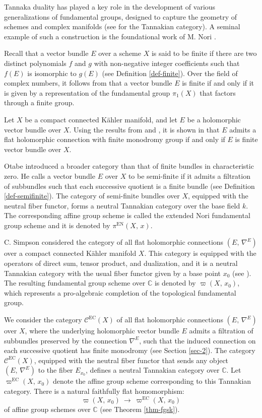 \documentclass[12pt]{amsart}
\theoremstyle{definition}
\numberwithin{equation}{section}
\newcommand{\C}{\mathbb{C}}
\newcommand{\EC}{\mathcal{C}^\mathrm{EC}}
\begin{document}
Tannaka duality has played a key role in the development of various generalizations 
of fundamental groups, designed to capture the geometry of schemes and complex 
manifolds (see \cite{DM} for the Tannakian category). A seminal example of such a 
construction is the foundational work of M. Nori \cite{No}.

Recall that a vector bundle $E$ over a scheme $X$ is said to be finite if there are 
two distinct polynomials $f$ and $g$ with non-negative integer coefficients such that 
$f(E)$ is isomorphic to $g(E)$ (see Definition \ref{def-finite}).
Over the field of complex numbers, it follows from \cite{No} that a vector bundle 
$E$ is finite if and only if it is given by a representation of the fundamental 
group $\pi_1(X)$ that factors through a finite group.

Let $X$ be a compact connected K\"ahler manifold, and let $E$ be a holomorphic vector 
bundle over $X$. Using the results from \cite{DPS} and \cite{Si}, it is shown in 
\cite{BHS} that $E$ admits a flat holomorphic connection with finite monodromy group
if and only if  $E$ is finite vector bundle over $X$.

Otabe \cite{Ot} introduced a broader category than that of finite bundles in 
characteristic zero. He calls a vector bundle $E$ over $X$ to be semi-finite 
if it admits a filtration of subbundles such that each successive quotient is a finite bundle 
(see Definition \ref{def-semifinite}). The category of semi-finite bundles over $X$, 
equipped with the neutral fiber functor, forms a neutral Tannakian category over the base field $k$. 
The corresponding affine group scheme is called the extended Nori fundamental group 
scheme and it is denoted by $\pi^{\mathrm{EN}}(X,\,x)$. 

C. Simpson \cite{Si} considered the category of all flat holomorphic connections 
$(E,\, \nabla^E)$ over a compact connected K\"ahler manifold $X$. 
This category is equipped with the operators of direct sum, tensor product, and 
dualization, and it is a neutral Tannakian category with the usual fiber functor given 
by a base point $x_0$ (see \cite[p. 70]{Si}). The resulting fundamental group scheme 
over $\C$ is denoted by $\varpi(X,\, x_0)$, which represents a pro-algebraic completion 
of the topological fundamental group. 

We consider the category $\EC(X)$ of all flat holomorphic connections $(E,\, \nabla^E)$ over 
$X$, where the underlying holomorphic vector bundle $E$ admits a filtration of subbundles 
preserved by the connection $\nabla^E$, such that the induced connection on each 
successive quotient has finite monodromy (see Section \ref{sec-2}). The category 
$\EC(X)$, equipped with the neutral fiber functor that sends any object $(E,\, \nabla^E)$ 
to the fiber $E_{x_0}$, defines a neutral Tannakian category over $\C$. 
Let $\varpi^{\mathrm{EC}}(X,\, x_0)$ denote the affine group scheme corresponding to 
this Tannakian category. There is a natural faithfully flat homomorphism:
$$
\varpi(X,\, x_0)\ \longrightarrow\ \varpi^{\mathrm{EC}}(X,\, x_0)
$$
of affine group schemes over $\C$ (see Theorem \ref{thm-fgsk}). 
\end{document}

